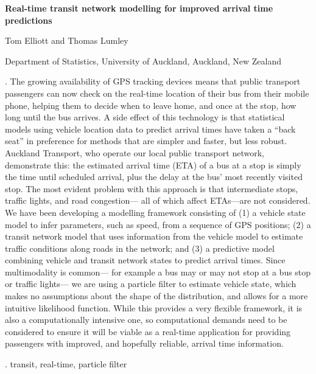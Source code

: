 \documentclass[12pt]{article}
\begin{document}
\begin{flushleft}


{\LARGE\bf Real-time transit network modelling for improved
arrival time predictions}


\vspace{1.0cm}

Tom Elliott and Thomas Lumley

\begin{description}

\item Department of Statistics, University of Auckland,
Auckland, New Zealand


\end{description}

\end{flushleft}


\vspace{0.75cm}

. %
The growing availability of GPS tracking devices means that %
public transport passengers can now check on the real-time location %
of their bus from their mobile phone, %
helping them to decide when to leave home, %
and once at the stop, how long until the bus arrives. %
A side effect of this technology is that %
statistical models using vehicle location data %
to predict arrival times have taken a ``back seat'' %
in preference for methods that are simpler and faster, %
but less robust. %
Auckland Transport, who operate our local public transport network, %
demonstrate this: %
the estimated arrival time (ETA) of a bus at a stop is simply %
the time until scheduled arrival, %
plus the delay at the bus' most recently visited stop. %
The most evident problem with this approach is that %
intermediate stops, traffic lights, and road congestion---%
all of which affect ETAs---are not considered. %
We have been developing a modelling framework consisting of %
(1) a vehicle state model to infer parameters, such as speed, %
from a sequence of GPS positions; %
(2) a transit network model that uses information from the vehicle model %
to estimate traffic conditions along roads in the network; %
and (3) a predictive model combining vehicle and transit network %
states to predict arrival times. %
Since multimodality is common---%
for example a bus may or may not stop at a bus stop or traffic lights---%
we are using a particle filter to estimate vehicle state, %
which makes no assumptions about the shape of the distribution, %
and allows for a more intuitive likelihood function. %
While this provides a very flexible framework, %
it is also a computationally intensive one, %
so computational demands need to be considered %
to ensure it will be viable as a real-time application %
for providing passengers with improved, and hopefully reliable, %
arrival time information.




\vskip 2mm

.
transit, real-time, particle filter
\end{document}
